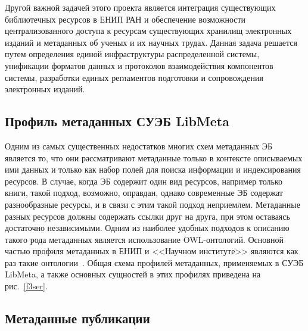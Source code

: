 \begin{multicols}{2}
  
    
  Другой важной задачей этого проекта является интеграция существующих библиотечных 
ресурсов в ЕНИП РАН и обеспечение возможности централизованного доступа к ресурсам 
существующих хранилищ электронных изданий и метаданных об ученых и их научных 
трудах. Данная задача решается путем определения единой инфраструктуры распределенной 
системы, унификации форматов данных и протоколов взаимодействия компонентов 
системы, разработки единых регламентов подготовки и сопровождения электронных 
изданий.
  
\vspace*{-6pt}

  \subsection*{Профиль метаданных СУЭБ LibMeta}
  
  Одним из самых существенных недостатков многих схем метаданных ЭБ является то, что 
они рассматривают метаданные только в контексте описываемых ими данных и только как 
набор полей для поиска информации и индексирования ресурсов. В случае, когда ЭБ 
содержит один вид ресурсов, например только книги, такой подход, возможно, оправдан, 
однако современные ЭБ содержат разнообразные ресурсы, и в связи с этим такой подход 
неприемлем. Метаданные разных ресурсов должны содержать ссылки друг на друга, при 
этом оставаясь достаточно независимыми. Одним из наиболее удобных подходов к 
описанию такого рода метаданных является использование OWL-онтологий. Основной 
частью профиля метаданных в ЕНИП и <<Научном институте>> являются как раз такие 
онтологии~\cite{8ser}. Общая схема профилей метаданных, применяемых в СУЭБ LibMeta, а 
также основных сущностей в этих профилях приведена на рис.~\ref{f3ser}.
  
\vspace*{-6pt}
  
  \subsection*{Метаданные публикации}
  

\end{multicols}
